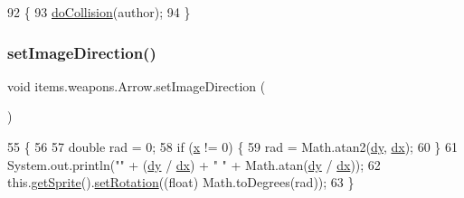 \begin{DoxyCode}
92                                                        \{
93         \mbox{\hyperlink{classitems_1_1weapons_1_1_arrow_aab7e6b254eafcc351c445269351900c0}{doCollision}}(author);
94     \}
\end{DoxyCode}
\mbox{\label{classitems_1_1weapons_1_1_arrow_a0382492d0b384efe35b57bd18d9cf20c}} 
\subsubsection{\texorpdfstring{set\+Image\+Direction()}{setImageDirection()}}
{\footnotesize\ttfamily void items.\+weapons.\+Arrow.\+set\+Image\+Direction (\begin{DoxyParamCaption}{ }\end{DoxyParamCaption})\hspace{0.3cm}{\ttfamily [inline]}}


\begin{DoxyCode}
55                                     \{
56 
57         \textcolor{keywordtype}{double} rad = 0;
58         \textcolor{keywordflow}{if} (\mbox{\hyperlink{classorg_1_1newdawn_1_1slick_1_1geom_1_1_shape_a3e985bfff386c15a4efaad03d8ad60d3}{x}} != 0) \{
59             rad = Math.atan2(\mbox{\hyperlink{classitems_1_1weapons_1_1_arrow_a41b7f69adb414e3b19c40785b6225b9c}{dy}}, \mbox{\hyperlink{classitems_1_1weapons_1_1_arrow_ad0f19f917fe7af158738ad8dadc0d0eb}{dx}});
60         \}
61         System.out.println(\textcolor{stringliteral}{""} + (\mbox{\hyperlink{classitems_1_1weapons_1_1_arrow_a41b7f69adb414e3b19c40785b6225b9c}{dy}} / \mbox{\hyperlink{classitems_1_1weapons_1_1_arrow_ad0f19f917fe7af158738ad8dadc0d0eb}{dx}}) + \textcolor{stringliteral}{" "} + Math.atan(\mbox{\hyperlink{classitems_1_1weapons_1_1_arrow_a41b7f69adb414e3b19c40785b6225b9c}{dy}} / \mbox{\hyperlink{classitems_1_1weapons_1_1_arrow_ad0f19f917fe7af158738ad8dadc0d0eb}{dx}}));
62         this.\mbox{\hyperlink{classentities_1_1_physical_entity_a000f49cb01d375f5e5fc254249b1d836}{getSprite}}().\mbox{\hyperlink{classorg_1_1newdawn_1_1slick_1_1_image_a6c4607d7ab6869b78ef6b81762b6698e}{setRotation}}((\textcolor{keywordtype}{float}) Math.toDegrees(rad));
63     \}
\end{DoxyCode}
\mbox{\label{classitems_1_1weapons_1_1_arrow_a4c0bb33aa961f0e0f4e9437003216275}} 
